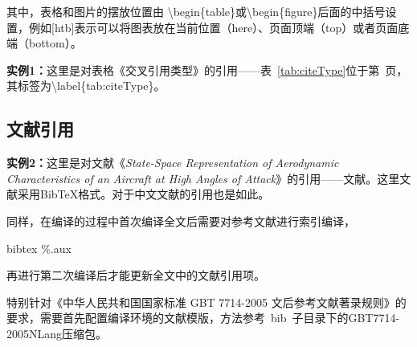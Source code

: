其中，表格和图片的摆放位置由 \textbackslash begin\{table\}或\textbackslash begin\{figure\}后面的中括号设置，例如[htb]表示可以将图表放在当前位置（here）、页面顶端（top）或者页面底端（bottom）。

{\bf{实例1：}}这里是对表格《交叉引用类型》的引用——表~\ref{tab:citeType}位于第~\pageref{tab:citeType}页，其标签为\textbackslash label\{tab:citeType\}。


\subsection{文献引用}
\label{sec:citeRefs}

{\bf{实例2：}}这里是对文献《{\it{State-Space Representation of Aerodynamic Characteristics of an Aircraft at High Angles of Attack}}》的引用——文献\cite{Goman:state_aerodynamics}。这里文献采用BibTeX格式。对于中文文献的引用也是如此\cite{BUAA:2002-CFD-missile}。

同样，在编译的过程中首次编译全文后需要对参考文献进行索引编译，

\begin{center}
  {\color{blue}bibtex \%.aux}
\end{center}

再进行第二次编译后才能更新全文中的文献引用项。

特别针对《中华人民共和国国家标准 GBT 7714-2005 文后参考文献著录规则》的要求，需要首先配置编译环境的文献模版，方法参考~bib~子目录下的GBT7714-2005NLang压缩包。
